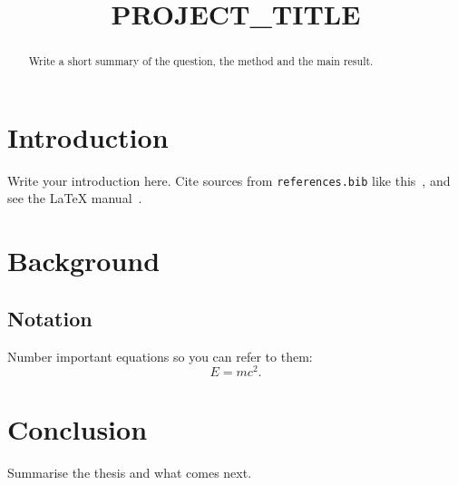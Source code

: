 \documentclass[twoside]{mitthesis}
\begin{document}
\title{{{PROJECT_TITLE}}}

\maketitle

\begin{abstract}
Write a short summary of the question, the method and the main result.
\end{abstract}

\tableofcontents

\chapter{Introduction}
Write your introduction here. Cite sources from \texttt{references.bib} like
this~\cite{einstein1905}, and see the \LaTeX{} manual~\cite{lamport1994}.

\chapter{Background}
\section{Notation}
Number important equations so you can refer to them:
\begin{equation}
  E = mc^2 . \label{eq:energy}
\end{equation}

\chapter{Conclusion}
Summarise the thesis and what comes next.



\end{document}
